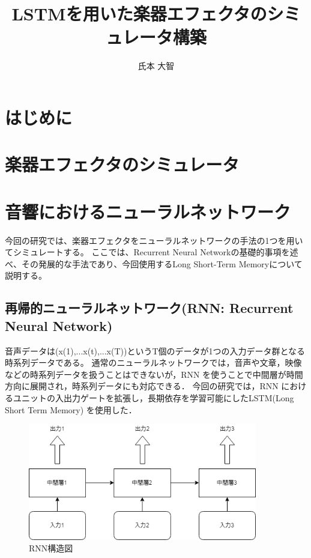 \documentclass{jreport}		%
\title{LSTMを用いた楽器エフェクタのシミュレータ構築}	%
\author{氏本 大智}			%
\begin{document}
%
\maketitle		%
\tableofcontents	%

\chapter{はじめに}

\chapter{楽器エフェクタのシミュレータ}

\chapter{音響におけるニューラルネットワーク}
今回の研究では、楽器エフェクタをニューラルネットワークの手法の1つを用いてシミュレートする。
ここでは、Recurrent Neural Networkの基礎的事項を述べ、その発展的な手法であり、今回使用するLong Short-Term Memoryについて説明する。

\section{再帰的ニューラルネットワーク(RNN: Recurrent Neural Network)}
音声データは(x(1),...x(t),...x(T))というT個のデータが1つの入力データ群となる時系列データである。
通常のニューラルネットワークでは，音声や文章，映像などの時系列データを扱うことはできないが，RNN を使うことで中間層が時間方向に展開され，時系列データにも対応できる．
今回の研究では，RNN におけるユニットの入出力ゲートを拡張し，長期依存を学習可能にしたLSTM(Long Short Term Memory) を使用した．

\begin{figure}[htbp]
 \begin{center}
  \includegraphics[width=100mm]{RNN.png}
 \end{center}
 \caption{RNN構造図}
 \label{fig:one}
\end{figure}
\end{document}

